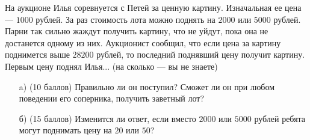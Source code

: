 
На аукционе Илья соревнуется с Петей за ценную картину.
	Изначальная ее цена --- $1000$ рублей. За раз стоимость лота
	можно поднять на $2000$ или $5000$ рублей. Парни так сильно 
	жаждут получить картину, что не уйдут, пока она не достанется 
	одному из них. Аукционист сообщил, что если цена за картину
	поднимется выше $28200$ рублей, то последний поднявший цену
	получит картину. Первым цену поднял Илья... (на сколько ---
	вы не знаете)
    
    \begin{enumerate}
        \item[a)] (10 баллов) Правильно ли он поступил? Сможет ли он при любом 
    поведении его соперника, получить заветный лот?
        \item[б)] (15 баллов) Изменится ли ответ, если вместо $2000$ или $5000$ рублей ребята могут
    поднимать цену на $20$ или $50$?
    
    \end{enumerate}